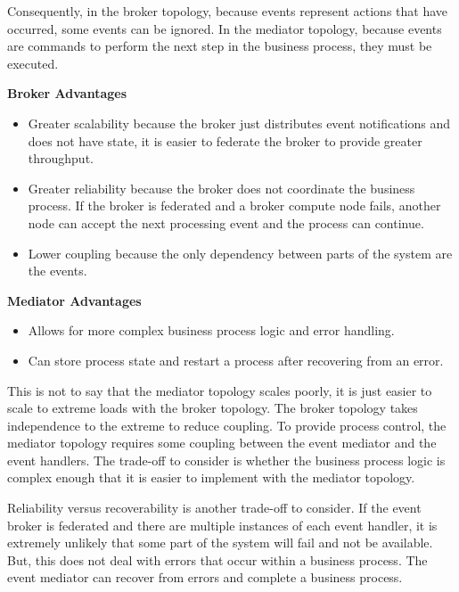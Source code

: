 Consequently, in the broker topology, because events represent actions that have occurred, some events can be ignored.
In the mediator topology, because events are commands to perform the next step in the business process, they must be executed.

\bigskip\noindent
\textbf{Broker Advantages}
\begin{itemize}[topsep=8pt,partopsep=4pt,itemsep=6pt,parsep=6pt]
    \item Greater scalability because the broker just distributes event notifications and does not have state,
            it is easier to federate the broker to provide greater throughput.
    \item Greater reliability because the broker does not coordinate the business process.
            If the broker is federated and a broker compute node fails, another node can accept the next processing event and the process can continue.
    \item Lower coupling because the only dependency between parts of the system are the events.
\end{itemize}

\noindent
\textbf{Mediator Advantages}
\begin{itemize}[topsep=8pt,partopsep=4pt,itemsep=6pt,parsep=6pt]
    \item Allows for more complex business process logic and error handling.
    \item Can store process state and restart a process after recovering from an error.
\end{itemize}

This is not to say that the mediator topology scales poorly, it is just easier to scale to extreme loads with the broker topology.
The broker topology takes independence to the extreme to reduce coupling.
To provide process control, the mediator topology requires some coupling between the event mediator and the event handlers.
The trade-off to consider is whether the business process logic is complex enough that it is easier to implement with the mediator topology.

Reliability versus recoverability is another trade-off to consider.
If the event broker is federated and there are multiple instances of each event handler,
it is extremely unlikely that some part of the system will fail and not be available.
But, this does not deal with errors that occur within a business process.
The event mediator can recover from errors and complete a business process.

